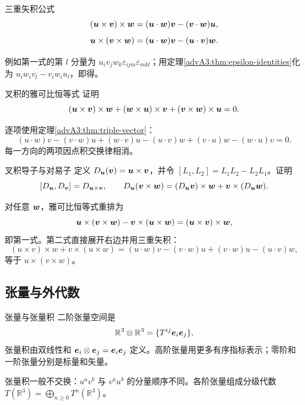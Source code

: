 \begin{advtheorem}{三重矢积公式}\label{advA3:thm:triple-vector}
\[
 (\bm{u}\times\bm{v})\times\bm{w}
 =(\bm{u}\cdot\bm{w})\bm{v}-(\bm{v}\cdot\bm{w})\bm{u},
\]
\[
 \bm{u}\times(\bm{v}\times\bm{w})
 =(\bm{u}\cdot\bm{w})\bm{v}-(\bm{u}\cdot\bm{v})\bm{w}.
\]
\end{advtheorem}
例如第一式的第 $l$ 分量为
$u_iv_jw_k\varepsilon_{ijm}\varepsilon_{mkl}$；用定理\ref{advA3:thm:epsilon-identities}化为
$u_iw_iv_l-v_iw_iu_l$，即得。

\begin{advexamplebox}{叉积的雅可比恒等式}\label{advA3:ex:jacobi-cross}
证明
\[
 (\bm{u}\times\bm{v})\times\bm{w}
 +(\bm{w}\times\bm{u})\times\bm{v}
 +(\bm{v}\times\bm{w})\times\bm{u}=0.
\]

\AQJacobi
\end{advexamplebox}
\begin{advsolution}
\AAJacobi

逐项使用定理\ref{advA3:thm:triple-vector}：
\[
 (u\cdot w)v-(v\cdot w)u
 +(w\cdot v)u-(u\cdot v)w
 +(v\cdot u)w-(w\cdot u)v=0.
\]
每一方向的两项因点积交换律相消。
\end{advsolution}

\begin{advexamplebox}{叉积导子与对易子}\label{advA3:ex:cross-derivation}
定义 $D_{\bm{u}}(\bm{v})=\bm{u}\times\bm{v}$，并令
$[L_1,L_2]=L_1L_2-L_2L_1$。证明
\[
 [D_{\bm{u}},D_{\bm{v}}]=D_{\bm{u}\times\bm{v}},
 \qquad
 D_{\bm{u}}(\bm{v}\times\bm{w})
 =(D_{\bm{u}}\bm{v})\times\bm{w}
 +\bm{v}\times(D_{\bm{u}}\bm{w}).
\]

\AQDerivations
\end{advexamplebox}
\begin{advsolution}
\AADerivations

对任意 $\bm{w}$，雅可比恒等式重排为
\[
 \bm{u}\times(\bm{v}\times\bm{w})
 -\bm{v}\times(\bm{u}\times\bm{w})
 =(\bm{u}\times\bm{v})\times\bm{w},
\]
即第一式。第二式直接展开右边并用三重矢积：
\[
 (u\times v)\times w+v\times(u\times w)
 =(u\cdot w)v-(v\cdot w)u+(v\cdot w)u-(u\cdot v)w,
\]
等于 $u\times(v\times w)$。
\end{advsolution}

\subsection{张量与外代数}

\begin{advdefinition}{张量与张量积}\label{advA3:def:tensor-product}
二阶张量空间是
\[
 \mathbb R^3\otimes\mathbb R^3
 =\{T^{ij}\bm{e}_i\bm{e}_j\},
\]
张量积由双线性和
$\bm{e}_i\otimes\bm{e}_j=\bm{e}_i\bm{e}_j$ 定义。高阶张量用更多有序指标表示；零阶和一阶张量分别是标量和矢量。
\end{advdefinition}
张量积一般不交换：$u^av^b$ 与 $v^au^b$ 的分量顺序不同。各阶张量组成分级代数
$T(\mathbb R^3)=\bigoplus_{n\ge0}T^n(\mathbb R^3)$。

